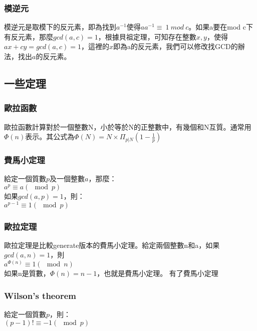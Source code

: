 \subsubsection{模逆元}
模逆元是取模下的反元素，即為找到$a^{-1}$使得$aa^{-1}\equiv\ 1\ mod\ c$。如果a要在mod c下有反元素，那麼$gcd(a,c)=1$，根據貝祖定理，可知存在整數$x,y$，使得$ax+cy=gcd(a,c)=1$，這裡的$x$即為a的反元素，我們可以修改找GCD的辦法，找出$a$的反元素。

\subsection{一些定理}
\subsubsection{歐拉函數}
歐拉函數計算對於一個整數N，小於等於N的正整數中，有幾個和N互質。通常用$\Phi(n)$表示。其公式為$\Phi(N)=N\times\Pi_{p|N}(1-\frac{1}{p})$

\subsubsection{費馬小定理}
給定一個質數$p$及一個整數$a$，那麼：\\
$a^p \equiv a (\mod p)$\\
如果$gcd(a,p)=1$，則：\\
$a^{p-1} \equiv 1 (\mod p)$\\
\subsubsection{歐拉定理}
歐拉定理是比較generate版本的費馬小定理。給定兩個整數n和a，如果$gcd(a,n)=1$，則\\
$a^{\Phi(n)} \equiv 1 (\mod n)$\\
如果n是質數，$\Phi(n)=n-1$，也就是費馬小定理。
有了費馬小定理
\subsubsection{Wilson's theorem}
給定一個質數$p$，則：\\
$(p-1)!\equiv -1 (\mod p)$
